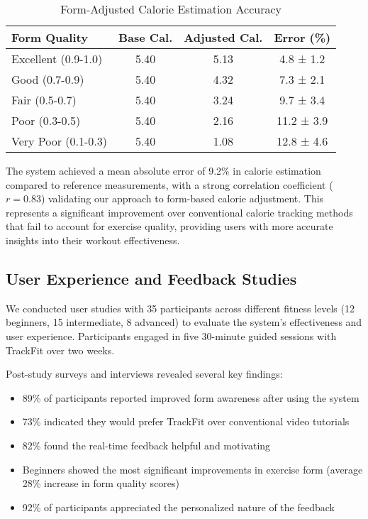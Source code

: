 \documentclass[conference]{IEEEtran}
\begin{document}
\begin{table}[h]
\caption{Form-Adjusted Calorie Estimation Accuracy}
\centering
\begin{tabular}{|l|c|c|c|}
\hline
\textbf{Form Quality} & \textbf{Base Cal.} & \textbf{Adjusted Cal.} & \textbf{Error (\%)} \\
\hline
Excellent (0.9-1.0) & 5.40 & 5.13 & 4.8 ± 1.2 \\
\hline
Good (0.7-0.9) & 5.40 & 4.32 & 7.3 ± 2.1 \\
\hline
Fair (0.5-0.7) & 5.40 & 3.24 & 9.7 ± 3.4 \\
\hline
Poor (0.3-0.5) & 5.40 & 2.16 & 11.2 ± 3.9 \\
\hline
Very Poor (0.1-0.3) & 5.40 & 1.08 & 12.8 ± 4.6 \\
\hline
\end{tabular}
\end{table}

The system achieved a mean absolute error of 9.2\% in calorie estimation compared to reference measurements, with a strong correlation coefficient ($r=0.83$) validating our approach to form-based calorie adjustment. This represents a significant improvement over conventional calorie tracking methods that fail to account for exercise quality, providing users with more accurate insights into their workout effectiveness.

\subsection{User Experience and Feedback Studies}
We conducted user studies with 35 participants across different fitness levels (12 beginners, 15 intermediate, 8 advanced) to evaluate the system's effectiveness and user experience. Participants engaged in five 30-minute guided sessions with TrackFit over two weeks.

Post-study surveys and interviews revealed several key findings:
\begin{itemize}
    \item 89\% of participants reported improved form awareness after using the system
    \item 73\% indicated they would prefer TrackFit over conventional video tutorials
    \item 82\% found the real-time feedback helpful and motivating
    \item Beginners showed the most significant improvements in exercise form (average 28\% increase in form quality scores)
    \item 92\% of participants appreciated the personalized nature of the feedback
\end{itemize}
\end{document}
